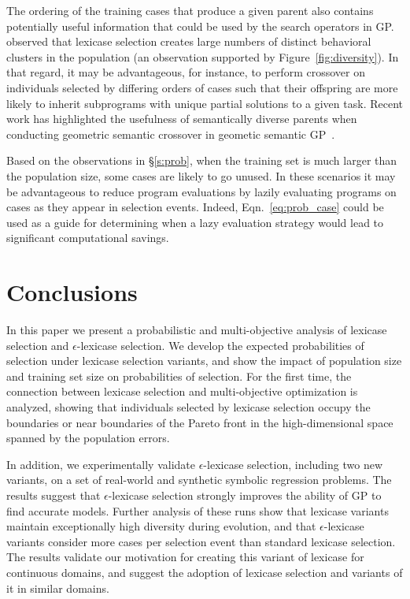\documentclass[twoside]{article}
\begin{document}
The ordering of the training cases that produce a given parent also contains potentially useful information that could be used by the search operators in GP. \cite{helmuth_general_2015-1} observed that lexicase selection creates large numbers of distinct behavioral clusters in the population (an observation supported by Figure~\ref{fig:diversity}). In that regard, it may be advantageous, for instance, to perform crossover on individuals selected by differing orders of cases such that their offspring are more likely to inherit subprograms with unique partial solutions to a given task. Recent work has highlighted the usefulness of semantically diverse parents when conducting geometric semantic crossover in geometic semantic GP~\citep{Chen2017}.   

Based on the observations in \S\ref{s:prob}, when the training set is much larger than the population size, some cases are likely to go unused. In these scenarios it may be advantageous to reduce program evaluations by lazily evaluating programs on cases as they appear in selection events. Indeed, Eqn.~\ref{eq:prob_case} could be used as a guide for determining when a lazy evaluation strategy would lead to significant computational savings.

\section{Conclusions}\label{s:conclusion}
In this paper we present a probabilistic and multi-objective analysis of lexicase selection and $\epsilon$-lexicase selection. We develop the expected probabilities of selection under lexicase selection variants, and show the impact of population size and training set size on probabilities of selection. For the first time, the connection between lexicase selection and multi-objective optimization is analyzed, showing that individuals selected by lexicase selection occupy the boundaries or near boundaries of the Pareto front in the high-dimensional space spanned by the population errors. 

In addition, we experimentally validate $\epsilon$-lexicase selection, including two new variants, on a set of real-world and synthetic symbolic regression problems. The results suggest that $\epsilon$-lexicase selection strongly improves the ability of GP to find accurate models. Further analysis of these runs show that lexicase variants maintain exceptionally high diversity during evolution, and that $\epsilon$-lexicase variants consider more cases per selection event than standard lexicase selection. The results validate our motivation for creating this variant of lexicase for continuous domains, and suggest the adoption of lexicase selection and variants of it in similar domains.  
\end{document}
